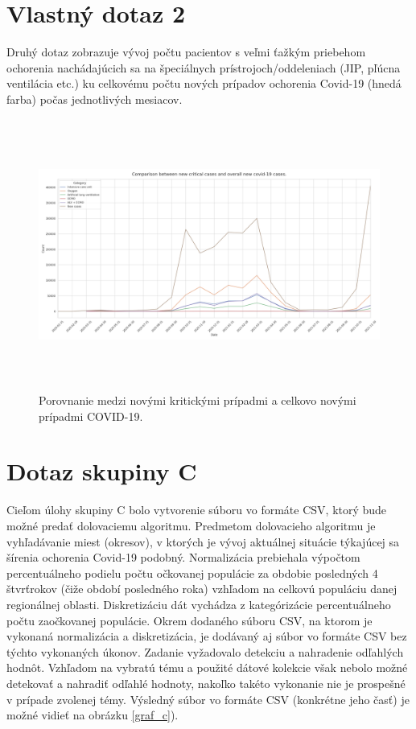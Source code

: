 \documentclass[a4paper, 16pt]{article}
\begin{document}
\section{Vlastný dotaz 2}

Druhý dotaz zobrazuje vývoj počtu pacientov s veľmi ťažkým priebehom ochorenia nachádajúcich sa na špeciálnych prístrojoch/oddeleniach (JIP, pľúcna ventilácia etc.) ku celkovému počtu nových prípadov ochorenia Covid-19 (hnedá farba) počas jednotlivých mesiacov.
\begin{figure}[H] \centering
    \includegraphics[width=\linewidth,height=3.5in]{QC2.png}
    \caption{Porovnanie medzi novými kritickými prípadmi a celkovo novými prípadmi COVID-19.}
    \label{graf_5}
\end{figure}

\newpage
\section{Dotaz skupiny C}

Cieľom úlohy skupiny C bolo vytvorenie súboru vo formáte CSV, ktorý bude možné predať dolovaciemu algoritmu. Predmetom dolovacieho algoritmu je vyhľadávanie miest (okresov), v ktorých je vývoj aktuálnej situácie týkajúcej sa šírenia ochorenia Covid-19 podobný. Normalizácia prebiehala výpočtom percentuálneho podielu počtu očkovanej populácie za obdobie posledných 4 štvrťrokov (čiže období posledného roka) vzhľadom na celkovú populáciu danej regionálnej oblasti. Diskretizáciu dát vychádza z kategórizácie percentuálneho počtu zaočkovanej populácie. Okrem dodaného súboru CSV, na ktorom je vykonaná normalizácia a diskretizácia, je dodávaný aj súbor vo formáte CSV bez týchto vykonaných úkonov. Zadanie vyžadovalo detekciu a nahradenie odľahlých hodnôt. Vzhľadom na vybratú tému a použité dátové kolekcie však nebolo možné detekovať a nahradiť odľahlé hodnoty, nakoľko takéto vykonanie nie je prospešné v prípade zvolenej témy. Výsledný súbor vo formáte CSV (konkrétne jeho časť) je možné vidieť na obrázku \ref{graf_c}).
\end{document}
